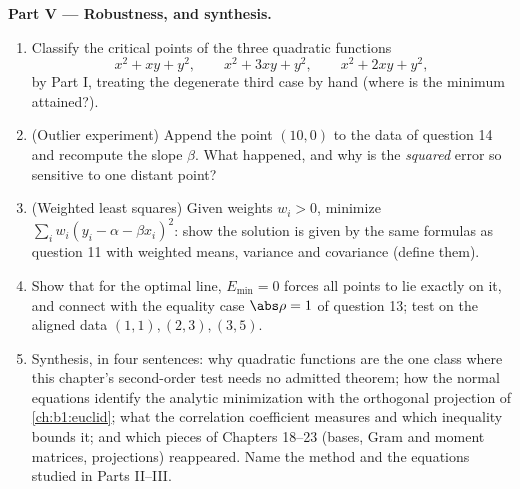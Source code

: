 \begin{problem}
\medskip
\noindent\textbf{Part V --- Robustness, and synthesis.}
\begin{enumerate}[resume]
  \item Classify the critical points of the three quadratic
        functions
        \[
        x^2 + xy + y^2, \qquad x^2 + 3xy + y^2, \qquad
        x^2 + 2xy + y^2 ,
        \]
        by Part I, treating the degenerate third case by hand
        (where is the minimum attained?).
  \item (Outlier experiment) Append the point $(10, 0)$ to the
        data of question 14 and recompute the slope $\beta$.
        What happened, and why is the \emph{squared} error so
        sensitive to one distant point?
  \item (Weighted least squares) Given weights $w_i > 0$,
        minimize $\sum_i w_i(y_i - \alpha - \beta x_i)^2$: show
        the solution is given by the same formulas as question
        11 with weighted means, variance and covariance
        (define them).
  \item Show that for the optimal line, $E_{\min} = 0$ forces
        all points to lie exactly on it, and connect with the
        equality case $\abs\rho = 1$ of question 13; test on the
        aligned data $(1,1), (2,3), (3,5)$.
  \item Synthesis, in four sentences: why quadratic functions
        are the one class where this chapter's second-order
        test needs no admitted theorem; how the normal equations
        identify the analytic minimization with the orthogonal
        projection of \cref{ch:b1:euclid}; what the correlation
        coefficient measures and which inequality bounds it;
        and which pieces of Chapters 18--23 (bases, Gram and
        moment matrices, projections) reappeared. Name the
        method and the equations studied in Parts II--III.
\end{enumerate}
\end{problem}
